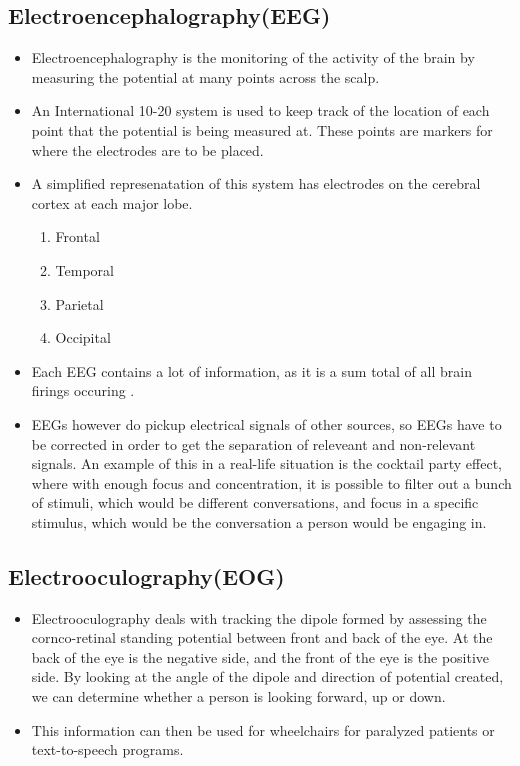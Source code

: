 \documentclass[11pt]{book}
\begin{document}
\subsection{Electroencephalography(EEG)}
\begin{itemize}
	\item Electroencephalography is the monitoring of the activity of the brain by measuring the potential at many points across the scalp.
	\item An International 10-20 system is used to keep track of the location of each point that the potential is being measured at. These points are markers for where the electrodes are to be placed.
	\item A simplified represenatation of this system has electrodes on the cerebral cortex at each major lobe.
	\begin{enumerate}
	\item Frontal
	\item Temporal
	\item Parietal
	\item Occipital
	\end{enumerate}
	\item Each EEG contains a lot of information, as it is a sum total of all brain firings occuring .
	\item EEGs however do pickup electrical signals of other sources, so EEGs have to be corrected in order to get the separation of releveant and non-relevant signals. An example of this in a real-life situation is the cocktail party effect, where with enough focus and concentration, it is possible to filter out a bunch of stimuli, which would be different conversations, and focus in a specific stimulus, which would be the conversation a person would be engaging in. 
\end{itemize}
	
\subsection{Electrooculography(EOG)}
\begin{itemize}
	\item Electrooculography deals with tracking the dipole formed by assessing the cornco-retinal standing potential between front and back of the eye. At the back of the eye is the negative side, and the front of the eye is the positive side. By looking at the angle of the dipole and direction of potential created, we can determine whether a person is looking forward, up or down.
	\item This information can then be used for wheelchairs for paralyzed patients or text-to-speech programs.
\end{itemize}
\end{document}
